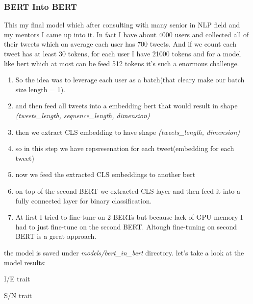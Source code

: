 \documentclass[10pt, a4paper]{article}
\begin{document}
\subsubsection{BERT Into BERT}
This my final model which after consulting with many senior in NLP field and my mentors I came up into it. In fact I have about 4000 users and collected all of their tweets which on average each user has 700 tweets.
And if we count each tweet has at least 30 tokens, for each user I have 21000 tokens and for a model like bert which at most can be feed 512 tokens it's such a enormous challenge.
\begin{enumerate}
    \item So the idea was to leverage each user as a batch(that cleary make our batch size length = 1).
    \item and then feed all tweets into a embedding bert that would result in shape \textit{(tweets\_length, sequence\_length, dimension)}
    \item then we extract CLS embedding to have shape \textit{(tweets\_length, dimension)}
    \item so in this step we have repsresenation for each tweet(embedding for each tweet)
    \item now we feed the extracted CLS embeddings to another bert
    \item on top of the second BERT we extracted CLS layer and then feed it into a fully connected layer for binary classification.
    \item At first I tried to fine-tune on 2 BERTs but because lack of GPU memory I had to just fine-tune on the second BERT. Altough fine-tuning on second BERT is a great approach.
\end{enumerate}
the model is saved under \textit{models/bert\_in\_bert} directory.
\newpage
let's take a look at the model results:
\begin{center}
    \begin{adjustbox}{max width=0.8\textwidth}
    \end{adjustbox}
\end{center}
\begin{center}
    I/E trait
\end{center}
\begin{center}
    \begin{adjustbox}{max width=0.8\textwidth}
    \end{adjustbox}
\end{center}
\begin{center}
    S/N trait
\end{center}
\end{document}
